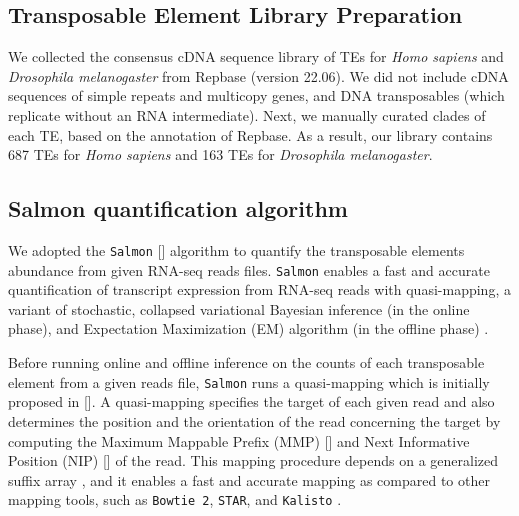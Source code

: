 \documentclass[wsdraft]{ws-procs11x85}
\begin{document}
\subsection{Transposable Element Library Preparation}
We collected the consensus cDNA sequence library of TEs for \textit{Homo sapiens} and \textit{Drosophila melanogaster} from Repbase  
(version 22.06)\cite{repbase}. We did not include cDNA sequences of simple repeats and multicopy genes, and DNA transposables (which replicate without an RNA intermediate). 
Next, we manually curated clades of each TE, based on the annotation of Repbase. As a result, our library contains 687 TEs for \textit{Homo sapiens} and 163 TEs for \textit{Drosophila melanogaster}.

\subsection{Salmon quantification algorithm}
We adopted the \verb|Salmon| [] algorithm to quantify the transposable elements abundance from given RNA-seq reads files. \verb|Salmon| enables a fast and accurate quantification of transcript expression from  RNA-seq reads with quasi-mapping, a variant of stochastic, collapsed variational Bayesian inference (in the online phase), and Expectation Maximization (EM) algorithm (in the offline phase)
\cite{patro2017salmon,srivastava2016rapmap,bishop2006pattern,foulds2013stochastic}. 

Before running online and offline inference on the counts of each transposable element from a given reads file,
% 
% 
% 
%
% 
%
\verb|Salmon| runs a quasi-mapping which is initially proposed in []. A quasi-mapping specifies the target of each given read and also determines the position and the orientation of the read concerning the target by computing the
Maximum Mappable Prefix (MMP) [] and Next Informative Position (NIP) [] of the read.
This mapping procedure depends on a generalized suffix array \cite{manber1993suffix}, 
and it enables a fast and accurate mapping as compared to other mapping tools, such as \verb|Bowtie 2|, \verb|STAR|, and \verb|Kalisto| \cite{srivastava2016rapmap}. 
\end{document}

